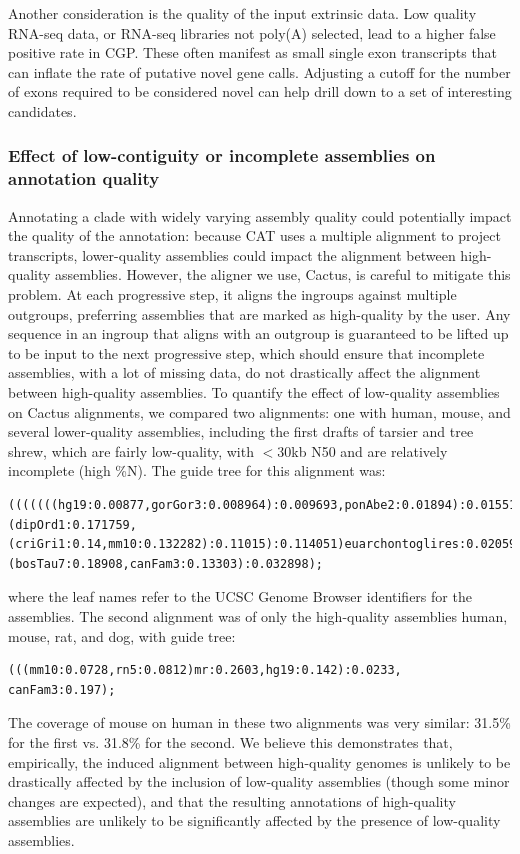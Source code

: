 \documentclass[fleqn,10pt]{wlscirep}
\begin{document}
Another consideration is the quality of the input extrinsic data. Low quality RNA-seq data, or RNA-seq libraries not poly(A) selected, lead to a higher false positive rate in CGP. These often manifest as small single exon transcripts that can inflate the rate of putative novel gene calls. Adjusting a cutoff for the number of exons required to be considered novel can help drill down to a set of interesting candidates.

\subsubsection*{Effect of low-contiguity or incomplete assemblies on annotation quality}
Annotating a clade with widely varying assembly quality could potentially impact the quality of the annotation: because CAT uses a multiple alignment to project transcripts, lower-quality assemblies could impact the alignment between high-quality assemblies. However, the aligner we use, Cactus, is careful to mitigate this problem. At each progressive step, it aligns the ingroups against multiple outgroups, preferring assemblies that are marked as high-quality by the user. Any sequence in an ingroup that aligns with an outgroup is guaranteed to be lifted up to be input to the next progressive step, which should ensure that incomplete assemblies, with a lot of missing data, do not drastically affect the alignment between high-quality assemblies. To quantify the effect of low-quality assemblies on Cactus alignments, we compared two alignments: one with human, mouse, and several lower-quality assemblies, including the first drafts of tarsier and tree shrew, which are fairly low-quality, with $<$30kb N50 and are relatively incomplete (high \%N). The guide tree for this alignment was:
\begin{lstlisting}
(((((((hg19:0.00877,gorGor3:0.008964):0.009693,ponAbe2:0.01894):0.015511,rheMac3:0.037601):0.07392,tarSyr1:0.1114):0.034014,tupChi1:0.19114):0.002,(dipOrd1:0.171759,(criGri1:0.14,mm10:0.132282):0.11015):0.114051)euarchontoglires:0.020593,(bosTau7:0.18908,canFam3:0.13303):0.032898);
\end{lstlisting}
where the leaf names refer to the UCSC Genome Browser identifiers for the assemblies. The second alignment was of only the high-quality assemblies human, mouse, rat, and dog, with guide tree:
\begin{lstlisting}
(((mm10:0.0728,rn5:0.0812)mr:0.2603,hg19:0.142):0.0233, canFam3:0.197);
\end{lstlisting}
The coverage of mouse on human in these two alignments was very similar: 31.5\% for the first vs. 31.8\% for the second. We believe this demonstrates that, empirically, the induced alignment between high-quality genomes is unlikely to be drastically affected by the inclusion of low-quality assemblies (though some minor changes are expected), and that the resulting annotations of high-quality assemblies are unlikely to be significantly affected by the presence of low-quality assemblies.
\end{document}

